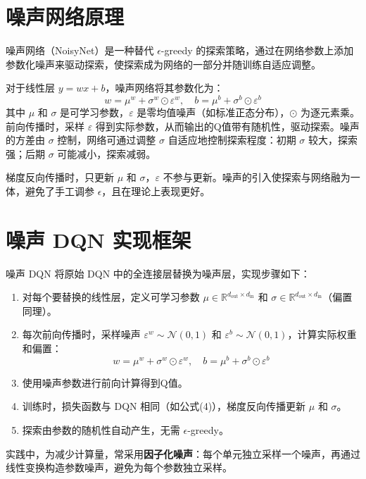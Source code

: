 \documentclass{article}
\begin{document}
\section{噪声网络原理}
噪声网络（NoisyNet）是一种替代 $\epsilon$-greedy 的探索策略，通过在网络参数上添加参数化噪声来驱动探索，使探索成为网络的一部分并随训练自适应调整。

对于线性层 $y = wx + b$，噪声网络将其参数化为：
\[
w = \mu^w + \sigma^w \odot \varepsilon^w, \quad b = \mu^b + \sigma^b \odot \varepsilon^b
\tag{28}
\]
其中 $\mu$ 和 $\sigma$ 是可学习参数，$\varepsilon$ 是零均值噪声（如标准正态分布），$\odot$ 为逐元素乘。前向传播时，采样 $\varepsilon$ 得到实际参数，从而输出的Q值带有随机性，驱动探索。噪声的方差由 $\sigma$ 控制，网络可通过调整 $\sigma$ 自适应地控制探索程度：初期 $\sigma$ 较大，探索强；后期 $\sigma$ 可能减小，探索减弱。

梯度反向传播时，只更新 $\mu$ 和 $\sigma$，$\varepsilon$ 不参与更新。噪声的引入使探索与网络融为一体，避免了手工调参 $\epsilon$，且在理论上表现更好。

\section{噪声 DQN 实现框架}
噪声 DQN 将原始 DQN 中的全连接层替换为噪声层，实现步骤如下：
\begin{enumerate}
    \item 对每个要替换的线性层，定义可学习参数 $\mu \in \mathbb{R}^{d_{\text{out}}\times d_{\text{in}}}$ 和 $\sigma \in \mathbb{R}^{d_{\text{out}}\times d_{\text{in}}}$（偏置同理）。
    \item 每次前向传播时，采样噪声 $\varepsilon^w \sim \mathcal{N}(0,1)$ 和 $\varepsilon^b \sim \mathcal{N}(0,1)$，计算实际权重和偏置：
    \[
    w = \mu^w + \sigma^w \odot \varepsilon^w,\quad b = \mu^b + \sigma^b \odot \varepsilon^b
    \]
    \item 使用噪声参数进行前向计算得到Q值。
    \item 训练时，损失函数与 DQN 相同（如公式(4)），梯度反向传播更新 $\mu$ 和 $\sigma$。
    \item 探索由参数的随机性自动产生，无需 $\epsilon$-greedy。
\end{enumerate}
实践中，为减少计算量，常采用\textbf{因子化噪声}：每个单元独立采样一个噪声，再通过线性变换构造参数噪声，避免为每个参数独立采样。
\end{document}
